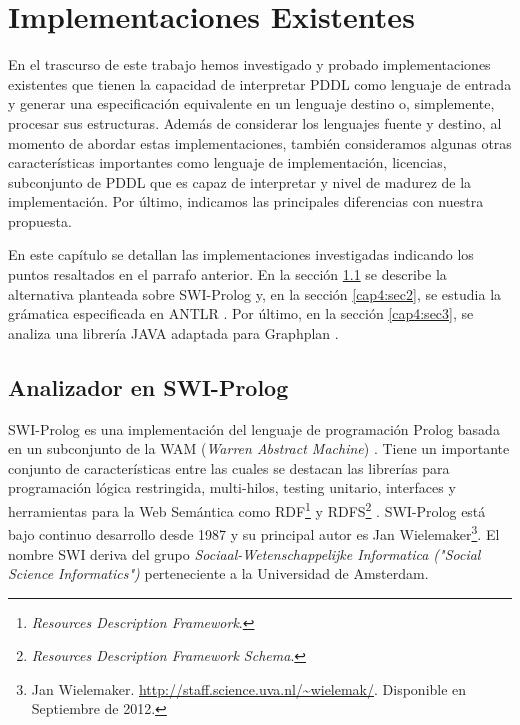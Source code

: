 
\chapter{Implementaciones Existentes} \label{pagcap4}

En el trascurso de este trabajo hemos investigado y
probado implementaciones existentes que tienen la
capacidad de interpretar PDDL como lenguaje de entrada 
y generar una especificaci\'on equivalente en un lenguaje 
destino o, simplemente, procesar sus estructuras.
Adem\'as de considerar los lenguajes fuente
y destino, al momento de abordar estas implementaciones,
tambi\'en consideramos algunas otras caracter\'isticas
importantes como lenguaje de implementaci\'on, licencias,
subconjunto de PDDL que es capaz de interpretar y
nivel de madurez de la implementaci\'on. Por \'ultimo, indicamos
las principales diferencias con nuestra propuesta.

En este cap\'itulo se detallan las implementaciones
investigadas indicando los puntos resaltados
en el parrafo anterior. En la secci\'on \ref{cap4:sec1} se describe
la alternativa planteada sobre SWI-Prolog \cite{gbraun:swiweb} y, en la secci\'on
\ref{cap4:sec2}, se estudia la gr\'amatica especificada 
en ANTLR \cite{gbraun:antlrtool}.
Por \'ultimo, en la secci\'on \ref{cap4:sec3}, se analiza una librer\'ia JAVA
adaptada para Graphplan \cite{gbraun:graphplan}.


\section{Analizador en SWI-Prolog} \label{cap4:sec1}

SWI-Prolog es una implementaci\'on del lenguaje de programaci\'on Prolog basada 
en un subconjunto de la WAM (\emph{Warren Abstract Machine}) \cite{gbraun:wam}.
Tiene un importante conjunto de caracter\'isticas entre las cuales se destacan
las librer\'ias para programaci\'on l\'ogica restringida, multi-hilos, testing unitario,
interfaces y herramientas para la Web Sem\'antica como 
RDF\footnote{\emph{Resources Description Framework}.} \cite{gbraun:w3cRDF} y 
RDFS\footnote{\emph{Resources Description Framework Schema}.} \cite{gbraun:w3cRDFS}.
SWI-Prolog est\'a bajo continuo desarrollo desde 1987 y su principal
autor es Jan Wielemaker\footnote{Jan
  Wielemaker. \url{http://staff.science.uva.nl/~wielemak/}. Disponible
en Septiembre de 2012.}.
El nombre SWI deriva del grupo \emph{Sociaal-Wetenschappelijke 
Informatica ("Social Science Informatics")} perteneciente
a la Universidad de Amsterdam.

